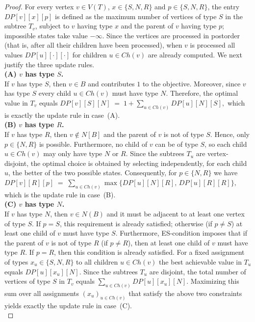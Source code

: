 \documentclass[11pt]{article}
\begin{document}
\begin{proof}
For every vertex $v\in V(T)$, $x\in\{S,N,R\}$ and $p\in\{S,N,R\}$, the entry $DP[v][x][p]$ is defined as the maximum number of vertices of type $S$ in the subtree $T_v$, subject to $v$ having type $x$ and the parent of $v$ having type $p$; impossible states take value $-\infty$. Since the vertices are processed in postorder (that is, after all their children have been processed), when $v$ is processed all values $DP[u][\cdot][\cdot]$ for children $u\in Ch(v)$ are already computed. We next justify the three update rules. \\

\noindent\textbf{(A) $v$ has type $S$.} \\ 
If $v$ has type $S$, then $v\in B$ and contributes $1$ to the objective. Moreover, since $v$ has type $S$ every child $u\in Ch(v)$ must have type $N$. Therefore, the optimal value in $T_v$ equals 
$DP[v][S][N] \;=\; 1 + \sum_{u\in Ch(v)} DP[u][N][S],$
which is exactly the update rule in case~(A). \\

\noindent\textbf{(B) $v$ has type $R$.} \\
If $v$ has type $R$, then $v\notin N[B]$ and the parent of $v$ is not of type $S$. Hence, only $p\in\{N,R\}$ is possible. Furthermore, no child of $v$ can be of type $S$, so each child $u\in Ch(v)$ may only have type $N$ or $R$. Since the subtrees $T_u$ are vertex-disjoint, the optimal choice is obtained by selecting independently, for each child $u$, the better of the two possible states. Consequently, for $p\in\{N,R\}$ we have
$DP[v][R][p] \;=\; \sum_{u\in Ch(v)} \max\{DP[u][N][R],\,DP[u][R][R]\},$
which is the update rule in case~(B). \\

\noindent\textbf{(C) $v$ has type $N$.} \\
If $v$ has type $N$, then $v\in N(B)$ and it must be adjacent to at least one vertex of type $S$. If $p=S$, this requirement is already satisfied; otherwise (if $p\neq S$) at least one child of $v$ must have type $S$. 
Furthermore, ES-condition imposes that if the parent of $v$ is not of type $R$ (if $p\neq R$), then at least one child of $v$ must have type $R$. If $p=R$, then this condition is already satisfied.
For a fixed assignment of types $x_u\in\{S,N,R\}$ to all children $u\in Ch(v)$ the best achievable value in $T_u$ equals $DP[u][x_u][N]$. Since the subtrees $T_u$ are disjoint, the total number of vertices of type $S$ in $T_v$ equals $\sum_{u\in Ch(v)} DP[u][x_u][N]$. Maximizing this sum over all assignments $(x_u)_{u\in Ch(v)}$ that satisfy the above two constraints yields exactly the update rule in case~(C). \\


\end{proof}
\end{document}
